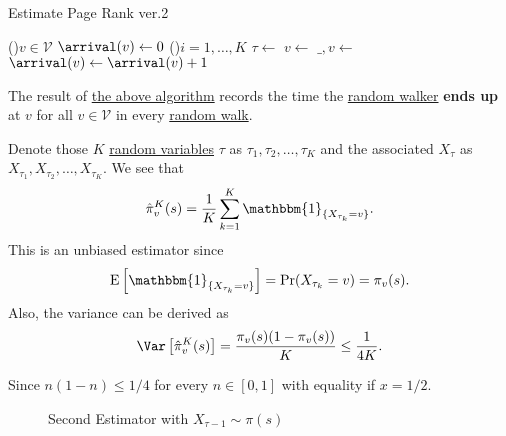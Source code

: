 \begin{algorithm}[H]\label{algo:Monte-Carlo-algorithm-2}
	\DontPrintSemicolon
	\caption{Estimate Page Rank ver.2}

	\BlankLine

	\For(){\(v\in \mathcal{V} \)}{
		\(\arrival(v)\gets 0\)\;
	}
	\;
	\For(){\(i = 1, \dots, K\)}{
		\(\tau \gets \) 
		\(v\gets \)
		\(\_, v\gets\)
		\(\arrival(v)\gets \arrival(v) + 1\)
	}
	\Return{\arrival}\;
\end{algorithm}
\begin{note}
	The result of \hyperref[algo:Monte-Carlo-algorithm-2]{the above algorithm} records the time the \hyperref[def:random-walker]{random walker} \textbf{ends up} at \(v\) for all \(v\in \mathcal{V} \) in every \hyperref[algo:random-walk-algorithm]{random walk}.
\end{note}

Denote those \(K\) \hyperref[def:random-variable]{random variables} \(\tau\) as \(\tau_1, \tau_2, \dots , \tau_K\) and the associated \(X_{\tau}\) as \(X_{\tau_1}, X_{\tau_2}, \dots , X_{\tau_K}\). We see that
\[
	\hat{\pi}_v^K(s) = \frac{1}{K}\sum\limits_{k=1}^{K} \mathbbm{1}_{\{X_{\tau_k} = v\}}.
\]
This is an unbiased estimator since
\[
	\mathrm{E}\left[\mathbbm{1}_{\{X_{\tau_k}=v\}}\right] = \Pr(X_{\tau_k} = v) = \pi_v(s).
\]
Also, the variance can be derived as
\[
	\Var\left[\hat{\pi}_v^K(s) \right] = \frac{\pi_v(s)(1 - \pi_v(s))}{K}\leq \frac{1}{4K}.
\]

\begin{remark}
	Since \(n(1-n)\leq 1/4\) for every \(n\in[0, 1]\) with equality if \(x = 1/2\).
\end{remark}

\begin{figure}[H]
	\centering
	\caption{Second Estimator with \(X_{\tau-1}\sim\pi(s)\)}
	\label{fig:Monte-Carlo-Estimator-2}
\end{figure}

